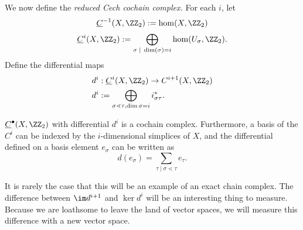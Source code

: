 We now define the \emph{reduced Cech cochain complex.} For each $i$, let
\[\underline C^{-1}(X, \ZZ_2):= \hom(X, \ZZ_2)\]
\[\underline C^i(X, \ZZ_2):= \bigoplus_{\sigma\;|\; \dim(\sigma)=i} \hom(U_\sigma, \ZZ_2).\]
Define the differential maps 
\begin{align*}
	d^i&: \underline C^i(X, \ZZ_2)\to C^{i+1}(X, \ZZ_2)\\
	d^i&:=\bigoplus_{\sigma\lessdot\tau, \dim\sigma=i} i^*_{\sigma\tau}.
\end{align*}
\begin{claim}
	$\underline C^\bullet(X, \ZZ_2)$ with differential $d^i$ is a cochain complex. Furthermore, a basis of the $C^i$ can be indexed by the $i$-dimensional simplices of $X$, and the differential defined on a basis element $e_\sigma$ can be written as 
	\[
		d(e_\sigma)=\sum_{\tau\;|\; \sigma\lessdot \tau} e_\tau.
	\]
\end{claim}
It is rarely the case that this will be an example of an exact chain complex. The difference between $\im d^{i+1}$ and $\ker d^i$ will be an interesting thing to measure.
Because we are loathsome to leave the land of vector spaces, we will measure this difference with a new vector space. 


